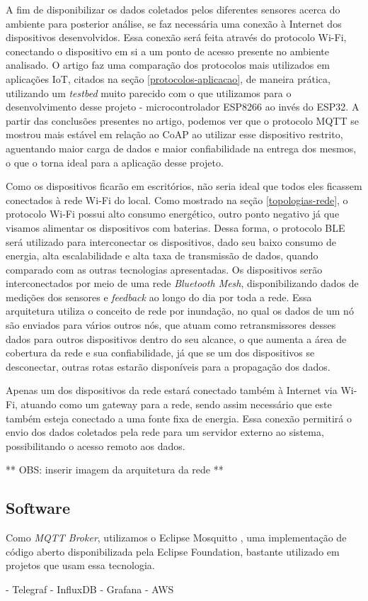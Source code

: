 \documentclass[../monografia.tex]{subfiles}
\begin{document}
A fim de disponibilizar os dados coletados pelos diferentes sensores acerca do ambiente para posterior análise, se faz necessária uma conexão à Internet dos dispositivos desenvolvidos. Essa conexão será feita através do protocolo Wi-Fi, conectando o dispositivo em si a um ponto de acesso presente no ambiente analisado. O artigo \cite{analise-protocolos-iot} faz uma comparação dos protocolos mais utilizados em aplicações IoT, citados na seção \ref{protocolos-aplicacao}, de maneira prática, utilizando um \textit{testbed} muito parecido com o que utilizamos para o desenvolvimento desse projeto - microcontrolador ESP8266 ao invés do ESP32. A partir das conclusões presentes no artigo, podemos ver que o protocolo MQTT se mostrou mais estável em relação ao CoAP ao utilizar esse dispositivo restrito, aguentando maior carga de dados e maior confiabilidade na entrega dos mesmos, o que o torna ideal para a aplicação desse projeto.

Como os dispositivos ficarão em escritórios, não seria ideal que todos eles ficassem conectados à rede Wi-Fi do local. Como mostrado na seção \ref{topologias-rede}, o protocolo Wi-Fi possui alto consumo energético, outro ponto negativo já que visamos alimentar os dispositivos com baterias. Dessa forma, o protocolo BLE será utilizado para interconectar os dispositivos, dado seu baixo consumo de energia, alta escalabilidade e alta taxa de transmissão de dados, quando comparado com as outras tecnologias apresentadas. Os dispositivos serão interconectados por meio de uma rede \textit{Bluetooth Mesh}, disponibilizando dados de medições dos sensores e \textit{feedback} ao longo do dia por toda a rede. Essa arquitetura utiliza o conceito de rede por inundação, no qual os dados de um nó são enviados para vários outros nós, que atuam como retransmissores desses dados para outros dispositivos dentro do seu alcance, o que aumenta a área de cobertura da rede e sua confiabilidade, já que se um dos dispositivos se desconectar, outras rotas estarão disponíveis para a propagação dos dados.

Apenas um dos dispositivos da rede estará conectado também à Internet via Wi-Fi, atuando como um gateway para a rede, sendo assim necessário que este também esteja conectado a uma fonte fixa de energia. Essa conexão permitirá o envio dos dados coletados pela rede para um servidor externo ao sistema, possibilitando o acesso remoto aos dados.


** OBS: inserir imagem da arquitetura da rede ** 

\subsection{Software}

Como \textit{MQTT Broker}, utilizamos o Eclipse Mosquitto \cite{mosquitto}, uma implementação de código aberto disponibilizada pela Eclipse Foundation, bastante utilizado em projetos que usam essa tecnologia.  

- Telegraf 
- InfluxDB
- Grafana
- AWS

\end{document}
